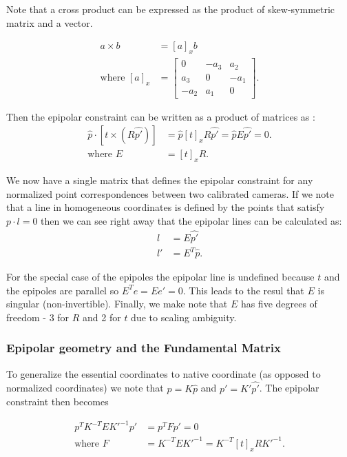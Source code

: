 \documentclass[twoside]{article}
\begin{document}
Note that a cross product can be expressed as the product of skew-symmetric matrix and a vector.

\begin{align}
a \times b &= [a]_x b \\
\text{where } [a]_x &= \begin{bmatrix}
0 & -a_3 & a_2 \\
a_3 & 0 & -a_1 \\
-a_2 & a_1 & 0 
\end{bmatrix} .
\end{align}

Then the epipolar constraint can be written as a product of matrices as :
\begin{align}
\hat{p} \cdot [t \times (R\hat{p'})] &= \hat{p} [t]_x R \hat{p'} = \hat{p}E\hat{p'} = 0. \\
\text{where } E &= [t]_xR.
\end{align}

We now have a single matrix that defines the epipolar constraint for any normalized point correspondences between two calibrated cameras. If we note that a line in homogeneous coordinates is defined by the points that satisfy $p \cdot l = 0$ then we can see right away that the epipolar lines can be calculated as:
\begin{align}
l &= E\hat{p'} \\
l' &= E^T\hat{p}.
\end{align}

For the special case of the epipoles the epipolar line is undefined because $t$ and the epipoles are parallel so $E^Te = Ee' = 0$. This leads to the resul that $E$ is singular (non-invertible). Finally, we make note that $E$ has five degrees of freedom - 3 for $R$ and 2 for $t$ due to scaling ambiguity.

\subsubsection{Epipolar geometry and the Fundamental Matrix \cite{FP}}

To generalize the essential coordinates to native coordinate (as opposed to normalized coordinates) we note that $p = K\hat{p}$ and $p' = K'\hat{p'}$. The epipolar constraint then becomes

\begin{align}
p^TK^{-T}EK'^{-1}p' &= p^T F p' = 0 \\
\text{where } F &= K^{-T}E K'^{-1} = K^{-T}[t]_x R K'^{-1}.
\end{align}
\end{document}
